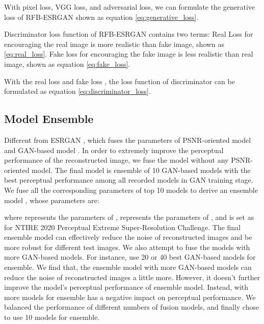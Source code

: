 \documentclass[10pt,twocolumn,letterpaper]{article}
\begin{document}
With pixel loss, VGG loss,  and adversarial loss, we can formulate the generative loss of RFB-ESRGAN shown as equation \eqref{eq:generative_loss}.


Discriminator loss function of RFB-ESRGAN contains two terms: Real Loss  for encouraging the real image is more realistic than fake image, shown as \eqref{eq:real_loss}. Fake loss  for encouraging the fake image is less realistic than real image, shown as equation \eqref{eq:fake_loss}. 






With the real loss  and fake loss , the loss function of discriminator can be formulated as equation \eqref{eq:discriminator_loss}.


\subsection{Model Ensemble}
Different from ESRGAN \cite{wang2018esrgan}, which fuses the parameters of PSNR-oriented model  and GAN-based model . In order to extremely improve the perceptual performance of the reconstructed image, we fuse the model without any PSNR-oriented model. The final model is ensemble of 10 GAN-based models with the best perceptual performance among all recorded models in GAN training stage. We fuse all the corresponding parameters of top 10 models to derive an ensemble model , whose parameters are:



where  represents the parameters of ,  represents the parameters of , and  is set as  for NTIRE 2020 Perceptual Extreme Super-Resolution Challenge. The final ensemble model  can effectively reduce the noise of reconstructed images and be more robust for different test images. We also attempt to fuse the models with more GAN-based models. For instance, use 20 or 40 best GAN-based models for ensemble. We find that, the ensemble model with more GAN-based models can reduce the noise of reconstructed images a little more. However, it doesn't further improve the model's perceptual performance of ensemble model. Instead, with more models for ensemble has a negative impact on perceptual performance. We balanced the performance of different numbers of fusion models, and finally chose to use 10 models for ensemble.
\end{document}
